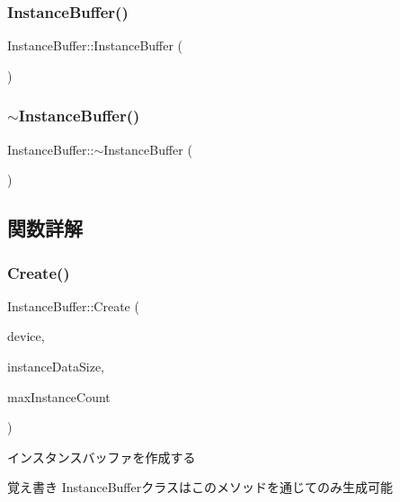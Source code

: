 \subsubsection{\texorpdfstring{Instance\+Buffer()}{InstanceBuffer()}}
{\footnotesize\ttfamily Instance\+Buffer\+::\+Instance\+Buffer (\begin{DoxyParamCaption}{ }\end{DoxyParamCaption})}

\mbox{\label{class_instance_buffer_a8ccc5533de5518e9a71d90ee0f08c6d3}} 
\subsubsection{\texorpdfstring{$\sim$\+Instance\+Buffer()}{~InstanceBuffer()}}
{\footnotesize\ttfamily Instance\+Buffer\+::$\sim$\+Instance\+Buffer (\begin{DoxyParamCaption}{ }\end{DoxyParamCaption})}



\subsection{関数詳解}
\mbox{\label{class_instance_buffer_acf5d0dd11793b224d2a10fa86876aac8}} 
\subsubsection{\texorpdfstring{Create()}{Create()}}
{\footnotesize\ttfamily Instance\+Buffer\+::\+Create (\begin{DoxyParamCaption}\item[{Com\+Ptr$<$ I\+D3\+D12\+Device $>$}]{device,  }\item[{size\+\_\+t}]{instance\+Data\+Size,  }\item[{int}]{max\+Instance\+Count }\end{DoxyParamCaption})\hspace{0.3cm}{\ttfamily [static]}}

インスタンスバッファを作成する \begin{DoxyNote}{覚え書き}
Instance\+Bufferクラスはこのメソッドを通じてのみ生成可能 
\end{DoxyNote}

